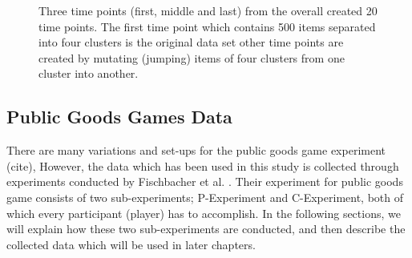 \begin{figure}[t]
\centering

\caption{Three time points (first, middle and last) from the overall created 20 time points. The first time point which contains 500 items separated into four clusters is the original data set other time points are created by mutating (jumping) items of four clusters from one cluster into another.}
\label{fig:synthesisData}
\end{figure}

\subsection{Public Goods Games Data}
\label{PublicGoodsGamesData}
There are many variations and set-ups for the public goods game experiment (cite), However, the data which has been used in this study is collected through experiments conducted by Fischbacher et al. \cite{Fischbacher2012}. Their experiment for public goods game consists of two sub-experiments; \gls{P-Experiment} and \gls{C-Experiment}, both of which every participant (player) has to accomplish. In the following sections, we will explain how these two sub-experiments are conducted, and then describe the collected data which will be used in later chapters.

